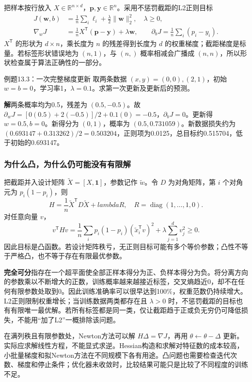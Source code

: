 \documentclass[UTF8,fontset=none,zihao=-4,a4paper]{ctexart}
\newcommand{\term}[1]{\textbf{#1}}
\newcommand{\sol}{\par\noindent\textbf{解}\quad}
\numberwithin{equation}{section}
\numberwithin{figure}{section}
\begin{document}
把样本按行放入 $X\in\mathbb R^{n\times d}$，$\symbf{p},\symbf{y}\in\mathbb R^n$。采用不惩罚截距的L2正则目标
\begin{align}
 J(\symbf{w},b)&=\frac1n\sum_i\ell_i+\frac\lambda2\|\symbf{w}\|_2^2,\quad\lambda\ge0,\\
 \nabla_wJ&=\frac1nX^{\mathsf T}(\symbf{p}-\symbf{y})+\lambda\symbf{w},\qquad
 \partial_bJ=\frac1n\sum_i(p_i-y_i).
\end{align}
$X^{\mathsf T}$ 的形状为 $d\times n$，乘长度为 $n$ 的残差得到长度为 $d$ 的权重梯度；截距梯度是标量。若标签形状错误地为 $(n,1)$，与 $(n,)$ 概率相减会广播成 $(n,n)$，所以形状检查属于算法正确性的一部分。

\begin{infobox}[unbreakable]{例题13.3：一次完整梯度更新}
取两条数据 $(x,y)=(0,0),(2,1)$，初始 $w=b=0$，学习率1，$\lambda=0.1$。求第一次更新及更新后的预测。
\sol 两条概率均为0.5，残差为 $(0.5,-0.5)$。故 $\partial_wJ=[0(0.5)+2(-0.5)]/2+0.1(0)=-0.5$，$\partial_bJ=0$。更新得 $w=0.5,b=0$。新得分为 $(0,1)$，概率为 $(0.5,0.731059)$。新数据损失约为 $(0.693147+0.313262)/2=0.503204$，正则项为0.0125，总目标约0.515704，低于初始的0.693147。
\end{infobox}

\subsubsection{为什么凸，为什么仍可能没有有限解}
把截距并入设计矩阵 $\widetilde X=[X,\symbf1]$，参数记作 $\widetilde w$。令 $D$ 为对角矩阵，第 $i$ 个对角元为 $p_i(1-p_i)$，则
\[
 H=\frac1n\widetilde X^{\mathsf T}D\widetilde X+lambda R,
 \quad R=\operatorname{diag}(1,\ldots,1,0).
\]
对任意向量 $v$，
\[
 v^{\mathsf T}Hv=\frac1n\sum_i p_i(1-p_i)(\widetilde x_i^{\mathsf T}v)^2
 +\lambda\sum_{j=1}^d v_j^2\ge0.
\]
因此目标是凸函数。若设计矩阵秩亏，无正则目标可能有多个等价参数；凸性不等于严格凸，也不等于存在有限最优参数。

\term{完全可分}指存在一个超平面使全部正样本得分为正、负样本得分为负。将分离方向的参数乘以不断增大的正数，训练概率越来越接近标签，交叉熵趋近0，却不在任何有限参数处取到0。因此训练准确率可以很早达到100\%，权重范数仍持续增大。L2正则限制权重增长；当训练数据两类都存在且 $\lambda>0$ 时，不惩罚截距的目标也有有限唯一最优解。若所有标签都是同一类，仅让截距趋于正或负无穷仍可降低损失，不能用“加了L2”一概排除该问题。

在满列秩且有限参数处，Newton方法可以解 $H\Delta=\nabla J$，再用 $\theta\leftarrow\theta-\Delta$ 更新。实际应求解线性方程，不能显式求逆。Hessian构造和求解对特征数的成本较高，小批量梯度和拟Newton方法在不同规模下各有用途。凸问题也需要检查迭代次数、梯度和停止条件；优化器未收敛时，比较结果可能只是比较了不同程度的训练不足。
\end{document}
